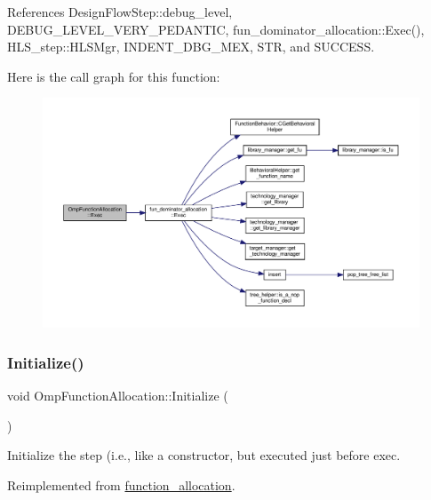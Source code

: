 References Design\+Flow\+Step\+::debug\+\_\+level, D\+E\+B\+U\+G\+\_\+\+L\+E\+V\+E\+L\+\_\+\+V\+E\+R\+Y\+\_\+\+P\+E\+D\+A\+N\+T\+IC, fun\+\_\+dominator\+\_\+allocation\+::\+Exec(), H\+L\+S\+\_\+step\+::\+H\+L\+S\+Mgr, I\+N\+D\+E\+N\+T\+\_\+\+D\+B\+G\+\_\+\+M\+EX, S\+TR, and S\+U\+C\+C\+E\+SS.

Here is the call graph for this function\+:
\nopagebreak
\begin{figure}[H]
\begin{center}
\leavevmode
\includegraphics[width=350pt]{de/db2/classOmpFunctionAllocation_a5ed037b259e632de3cad930b2b5cc8ef_cgraph}
\end{center}
\end{figure}
\mbox{\label{classOmpFunctionAllocation_a7ed35644fe18a1430f3bcf546bef1c1a}} 
\subsubsection{\texorpdfstring{Initialize()}{Initialize()}}
{\footnotesize\ttfamily void Omp\+Function\+Allocation\+::\+Initialize (\begin{DoxyParamCaption}{ }\end{DoxyParamCaption})\hspace{0.3cm}{\ttfamily [virtual]}}



Initialize the step (i.\+e., like a constructor, but executed just before exec. 



Reimplemented from \hyperlink{classfunction__allocation_a48d784232dd4383a11ff009a3cd78b30}{function\+\_\+allocation}.



